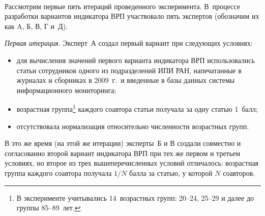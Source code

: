 \begin{multicols}{2}
\begin{figure*} %
\vspace*{1pt}
\begin{center}
\mbox{%
\epsfxsize=122.775mm
}
\end{center}
\vspace*{-12pt}
\end{figure*}

   
   Рассмотрим первые пять итераций проведенного эксперимента. В~процессе разработки 
вариантов индикатора ВРП участвовало пять экспертов (обозначим их как {A}, 
{Б}, {В}, {Г} и~{Д}).
   
   
   \textit{Первая итерация}. Эксперт~{А} создал первый вариант при следующих 
условиях:\\[-14pt]
   \begin{itemize}
\item для вычисления значений первого варианта индикатора ВРП использовались статьи 
сотрудников одного из подразделений ИПИ РАН, напечатанные в журналах и сборниках 
в 2009~г.\ и введенные в базы данных системы информационного мониторинга;
\item возрастная группа\footnote{В эксперименте учитывались 14~возрастных групп: 20--24, 
25--29 и далее до группы 85--89~лет.} каждого соавтора статьи получала за одну статью 
1~балл;
\pagebreak
\item отсутствовала нормализация относительно чис\-лен\-ности возрастных групп.
\end{itemize}

   В это же время (на этой же итерации) эксперты~{Б} и {В} создали совместно и 
согласованно второй вариант индикатора ВРП при тех же первом и третьем условиях, но 
второе из трех вышеперечисленных условий отличалось: возрастная группа каждого 
соавтора получала $1/N$ балла за статью, у которой $N$ соавторов.
   

\end{multicols}
